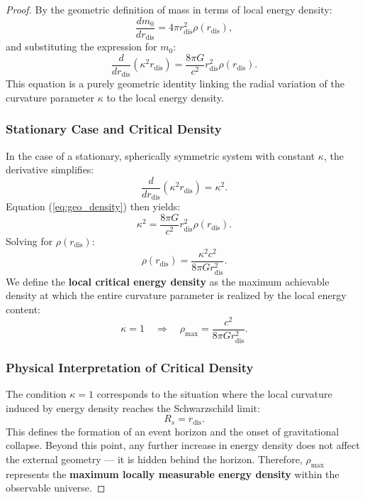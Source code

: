 \documentclass{article}
\begin{document}
\begin{theorem}
\begin{proof}
By the geometric definition of mass in terms of local energy density:
\begin{equation}
\frac{d m_0}{d r_{\text{dis}}} = 4\pi r_{\text{dis}}^2 \rho(r_{\text{dis}}),
\end{equation}
and substituting the expression for $m_0$:
\begin{equation}
\frac{d}{d r_{\text{dis}}} \left( \kappa^2 r_{\text{dis}} \right) = \frac{8\pi G}{c^2} r_{\text{dis}}^2 \rho(r_{\text{dis}}).
\label{eq:geo_density}
\end{equation}
This equation is a purely geometric identity linking the radial variation of the curvature parameter $\kappa$ to the local energy density.

\subsubsection{Stationary Case and Critical Density}

In the case of a stationary, spherically symmetric system with constant $\kappa$, the derivative simplifies:
\begin{equation}
\frac{d}{d r_{\text{dis}}} \left( \kappa^2 r_{\text{dis}} \right) = \kappa^2.
\end{equation}
Equation (\ref{eq:geo_density}) then yields:
\begin{equation}
\kappa^2 = \frac{8\pi G}{c^2} r_{\text{dis}}^2 \rho(r_{\text{dis}}).
\end{equation}
Solving for $\rho(r_{\text{dis}})$:
\begin{equation}
\rho(r_{\text{dis}}) = \frac{\kappa^2 c^2}{8\pi G r_{\text{dis}}^2}.
\end{equation}
We define the \textbf{local critical energy density} as the maximum achievable density at which the entire curvature parameter is realized by the local energy content:
\begin{equation}
\kappa = 1 \quad \Rightarrow \quad \rho_{\text{max}} = \frac{c^2}{8\pi G r_{\text{dis}}^2}.
\end{equation}
\subsubsection{Physical Interpretation of Critical Density}

The condition $\kappa = 1$ corresponds to the situation where the local curvature induced by energy density reaches the Schwarzschild limit:
\begin{equation}
R_s = r_{\text{dis}}.
\end{equation}
This defines the formation of an event horizon and the onset of gravitational collapse. Beyond this point, any further increase in energy density does not affect the external geometry — it is hidden behind the horizon. Therefore, $\rho_{\text{max}}$ represents the \textbf{maximum locally measurable energy density} within the observable universe.


\end{proof}
\end{theorem}
\end{document}
